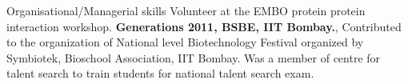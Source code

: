 \begin{rubric}{Organisational/Managerial skills}
\entry*[2019] Volunteer at the EMBO protein protein interaction workshop.
%
\entry*[2012] \textbf{Generations 2011, BSBE, IIT Bombay.}, Contributed to the organization of National level Biotechnology Festival organized by Symbiotek, Bioschool Association, IIT Bombay.
\entry*[2009-2010] Was a member of centre for talent search to train students for national talent search exam.

\end{rubric}